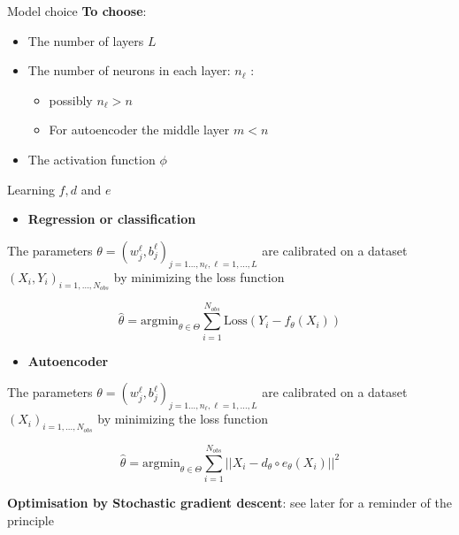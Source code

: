 \documentclass[
  ignorenonframetext,
]{beamer}
\providecommand{\tightlist}{%
  \setlength{\itemsep}{0pt}\setlength{\parskip}{0pt}}
\begin{document}
\begin{frame}{Model choice}
\protect\hypertarget{model-choice}{}
\textbf{To choose}:

\begin{itemize}
\item
  The number of layers \(L\)
\item
  The number of neurons in each layer: \(n_\ell\) :

  \begin{itemize}
  \tightlist
  \item
    possibly \(n_\ell > n\)
  \item
    For autoencoder the middle layer \(m < n\)
  \end{itemize}
\item
  The activation function \(\phi\)
\end{itemize}
\end{frame}

\begin{frame}{Learning \(f,d\) and \(e\)}
\protect\hypertarget{learning-fd-and-e}{}
\begin{itemize}
\tightlist
\item
  \textbf{Regression or classification}
\end{itemize}

The parameters
\(\theta = (w^\ell_j,b^\ell_j)_{j = 1\dots,n_\ell, \ell = 1,\dots,L}\)
are calibrated on a dataset \((X_i,Y_i)_{i=1, \dots , N_{obs}}\) by
minimizing the loss function

\[\widehat{\theta} = \mbox{argmin}_{\theta \in\Theta}  \sum_{i=1}^{N_{obs}}\mbox{Loss}(Y_i - f_{\theta}(X_i))\]

\begin{itemize}
\tightlist
\item
  \textbf{Autoencoder}
\end{itemize}

The parameters
\(\theta = (w^\ell_j,b^\ell_j)_{j = 1\dots,n_\ell, \ell = 1,\dots,L}\)
are calibrated on a dataset \((X_i)_{i=1, \dots , N_{obs}}\) by
minimizing the loss function

\[\widehat{\theta} = \mbox{argmin}_{\theta \in\Theta}  \sum_{i=1}^{N_{obs}}||X_i - d_{\theta}\circ e_{\theta}(X_i)||^2\]

\textbf{Optimisation by Stochastic gradient descent}: see later for a
reminder of the principle
\end{frame}
\end{document}

